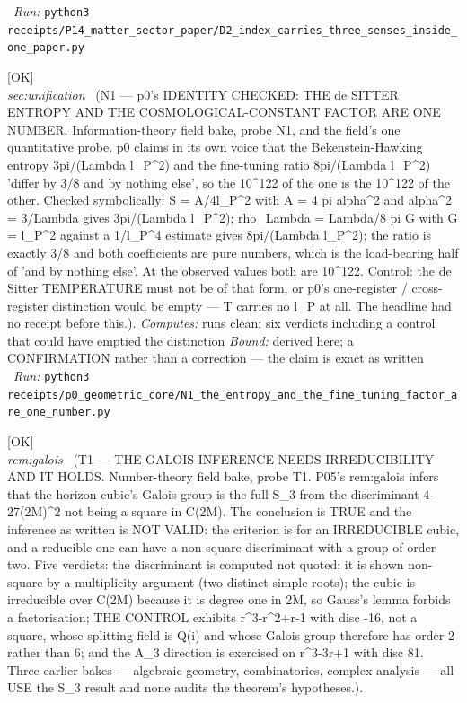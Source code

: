 \begin{description}
\ \emph{Run:} \texttt{python3 receipts/P14\_matter\_sector\_paper/D2\_index\_carries\_three\_senses\_inside\_one\_paper.py}
\item[\label{rcpt:N1_the_entropy_and_the_fine_tuning_factor_are_one_number}\texttt{N1\_the\_entropy\_and\_the\_fine\_tuning\_factor\_are\_one\_number}]\hfill\textsf{[OK]}\\
\textit{sec:unification} \ (N1 --- p0's IDENTITY CHECKED: THE de SITTER ENTROPY AND THE COSMOLOGICAL-CONSTANT FACTOR ARE ONE NUMBER. Information-theory field bake, probe N1, and the field's one quantitative probe. p0 claims in its own voice that the Bekenstein-Hawking entropy 3pi/(Lambda l\_P\textasciicircum{}2) and the fine-tuning ratio 8pi/(Lambda l\_P\textasciicircum{}2) 'differ by 3/8 and by nothing else', so the 10\textasciicircum{}122 of the one is the 10\textasciicircum{}122 of the other. Checked symbolically: S = A/4l\_P\textasciicircum{}2 with A = 4 pi alpha\textasciicircum{}2 and alpha\textasciicircum{}2 = 3/Lambda gives 3pi/(Lambda l\_P\textasciicircum{}2); rho\_Lambda = Lambda/8 pi G with G = l\_P\textasciicircum{}2 against a 1/l\_P\textasciicircum{}4 estimate gives 8pi/(Lambda l\_P\textasciicircum{}2); the ratio is exactly 3/8 and both coefficients are pure numbers, which is the load-bearing half of 'and by nothing else'. At the observed values both are 10\textasciicircum{}122. Control: the de Sitter TEMPERATURE must not be of that form, or p0's one-register / cross-register distinction would be empty --- T carries no l\_P at all. The headline had no receipt before this.). 
\emph{Computes:} runs clean; six verdicts including a control that could have emptied the distinction
 \emph{Bound:} derived here; a CONFIRMATION rather than a correction --- the claim is exact as written
\ \emph{Run:} \texttt{python3 receipts/p0\_geometric\_core/N1\_the\_entropy\_and\_the\_fine\_tuning\_factor\_are\_one\_number.py}
\item[\label{rcpt:T1_the_galois_inference_needs_irreducibility_and_it_holds}\texttt{T1\_the\_galois\_inference\_needs\_irreducibility\_and\_it\_holds}]\hfill\textsf{[OK]}\\
\textit{rem:galois} \ (T1 --- THE GALOIS INFERENCE NEEDS IRREDUCIBILITY AND IT HOLDS. Number-theory field bake, probe T1. P05's rem:galois infers that the horizon cubic's Galois group is the full S\_3 from the discriminant 4-27(2M)\textasciicircum{}2 not being a square in C(2M). The conclusion is TRUE and the inference as written is NOT VALID: the criterion is for an IRREDUCIBLE cubic, and a reducible one can have a non-square discriminant with a group of order two. Five verdicts: the discriminant is computed not quoted; it is shown non-square by a multiplicity argument (two distinct simple roots); the cubic is irreducible over C(2M) because it is degree one in 2M, so Gauss's lemma forbids a factorisation; THE CONTROL exhibits r\textasciicircum{}3-r\textasciicircum{}2+r-1 with disc -16, not a square, whose splitting field is Q(i) and whose Galois group therefore has order 2 rather than 6; and the A\_3 direction is exercised on r\textasciicircum{}3-3r+1 with disc 81. Three earlier bakes --- algebraic geometry, combinatorics, complex analysis --- all USE the S\_3 result and none audits the theorem's hypotheses.). 

\end{description}
